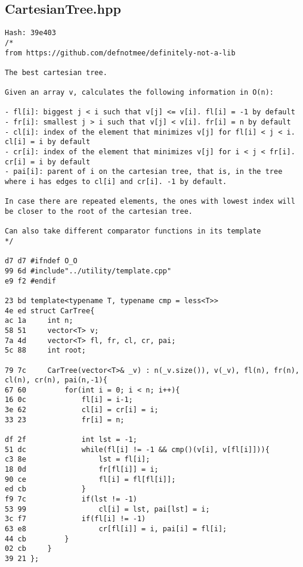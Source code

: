 \documentclass[11pt, a4paper, twoside]{article}
\begin{document}
\subsection{CartesianTree.hpp}
\begin{lstlisting}
Hash: 39e403
/*
from https://github.com/defnotmee/definitely-not-a-lib

The best cartesian tree.

Given an array v, calculates the following information in O(n):

- fl[i]: biggest j < i such that v[j] <= v[i]. fl[i] = -1 by default
- fr[i]: smallest j > i such that v[j] < v[i]. fr[i] = n by default
- cl[i]: index of the element that minimizes v[j] for fl[i] < j < i. cl[i] = i by default
- cr[i]: index of the element that minimizes v[j] for i < j < fr[i]. cr[i] = i by default
- pai[i]: parent of i on the cartesian tree, that is, in the tree where i has edges to cl[i] and cr[i]. -1 by default.

In case there are repeated elements, the ones with lowest index will be closer to the root of the cartesian tree.

Can also take different comparator functions in its template
*/

d7 d7 #ifndef O_O
99 6d #include"../utility/template.cpp"
e9 f2 #endif

23 bd template<typename T, typename cmp = less<T>>
4e ed struct CarTree{
ac 1a     int n;
58 51     vector<T> v;
7a 4d     vector<T> fl, fr, cl, cr, pai;
5c 88     int root;
      
79 7c     CarTree(vector<T>& _v) : n(_v.size()), v(_v), fl(n), fr(n), cl(n), cr(n), pai(n,-1){
67 60         for(int i = 0; i < n; i++){
16 0c             fl[i] = i-1;
3e 62             cl[i] = cr[i] = i;
33 23             fr[i] = n;
      
df 2f             int lst = -1;
51 dc             while(fl[i] != -1 && cmp()(v[i], v[fl[i]])){
c3 8e                 lst = fl[i];
18 0d                 fr[fl[i]] = i;
90 ce                 fl[i] = fl[fl[i]];
ed cb             }
f9 7c             if(lst != -1)
53 99                 cl[i] = lst, pai[lst] = i;
3c f7             if(fl[i] != -1)
63 e8                 cr[fl[i]] = i, pai[i] = fl[i];
44 cb         }
02 cb     }
39 21 };
\end{lstlisting}
\end{document}
